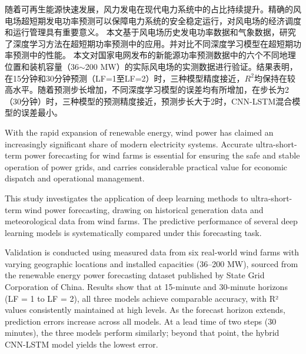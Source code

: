 \documentclass[AutoFakeBold=2.5]{myclass}
\begin{document}
\makecover 

\Englishmakecover
\setcounter{page}{1} %
\clearpage

\begin{cnabstract}

随着可再生能源快速发展，风力发电在现代电力系统中的占比持续提升。精确的风电场超短期发电功率预测可以保障电力系统的安全稳定运行，对风电场的经济调度和运行管理具有重要意义。
本文基于风电场历史发电功率数据和气象数据，研究了深度学习方法在超短期功率预测中的应用。并对比不同深度学习模型在超短期功率预测中的性能。
本文对国家电网发布的新能源功率预测数据中的六个不同地理位置和装机容量（36$\sim$200 MW）的实际风电场的实测数据进行验证。结果表明，在15分钟和30分钟预测（LF=1至LF=2）时，三种模型精度接近，$R^2$均保持在较高水平。随着预测步长增加，不同深度学习模型的误差均有所增加，在步长为2（30分钟）时，三种模型的预测精度接近，预测步长大于2时，CNN-LSTM混合模型的误差最小。


\end{cnabstract}


\begin{enabstract}
With the rapid expansion of renewable energy, wind power has claimed an increasingly significant share of modern electricity systems. Accurate ultra-short-term power forecasting for wind farms is essential for ensuring the safe and stable operation of power grids, and carries considerable practical value for economic dispatch and operational management.

This study investigates the application of deep learning methods to ultra-short-term wind power forecasting, drawing on historical generation data and meteorological data from wind farms. The predictive performance of several deep learning models is systematically compared under this forecasting task.

Validation is conducted using measured data from six real-world wind farms with varying geographic locations and installed capacities (36–200 MW), sourced from the renewable energy power forecasting dataset published by State Grid Corporation of China. Results show that at 15-minute and 30-minute horizons (LF = 1 to LF = 2), all three models achieve comparable accuracy, with R² values consistently maintained at high levels. As the forecast horizon extends, prediction errors increase across all models. At a lead time of two steps (30 minutes), the three models perform similarly; beyond that point, the hybrid CNN-LSTM model yields the lowest error.
\end{enabstract}
\end{document}

